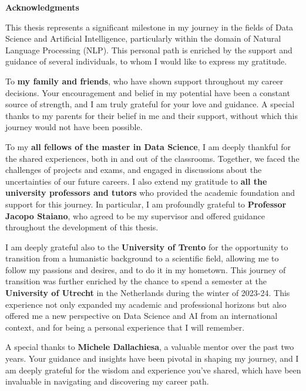 \begin{center}
    \normalsize\textbf{Acknowledgments}
\end{center}

This thesis represents a significant milestone in my journey in the fields of Data Science and Artificial Intelligence, particularly within the domain of Natural Language Processing (NLP). This personal path is enriched by the support and guidance of several individuals, to whom I would like to express my gratitude.

To \textbf{my family and friends}, who have shown support throughout my career decisions. Your encouragement and belief in my potential have been a constant source of strength, and I am truly grateful for your love and guidance. A special thanks to my parents for their belief in me and their support, without which this journey would not have been possible.

To my \textbf{all fellows of the master in Data Science}, I am deeply thankful for the shared experiences, both in and out of the classrooms. Together, we faced the challenges of projects and exams, and engaged in discussions about the uncertainties of our future careers. I also extend my gratitude to \textbf{all the university professors and tutors} who provided the academic foundation and support for this journey. In particular, I am profoundly grateful to \textbf{Professor Jacopo Staiano}, who agreed to be my supervisor and offered guidance throughout the development of this thesis.

I am deeply grateful also to the \textbf{University of Trento} for the opportunity to transition from a humanistic background to a scientific field, allowing me to follow my passions and desires, and to do it in my hometown. This journey of transition was further enriched by the chance to spend a semester at the \textbf{University of Utrecht} in the Netherlands during the winter of 2023-24. This experience not only expanded my academic and professional horizons but also offered me a new perspective on Data Science and AI from an international context, and for being a personal experience that I will remember.

A special thanks to \textbf{Michele Dallachiesa}, a valuable mentor over the past two years. Your guidance and insights have been pivotal in shaping my journey, and I am deeply grateful for the wisdom and experience you’ve shared, which have been invaluable in navigating and discovering my career path.

